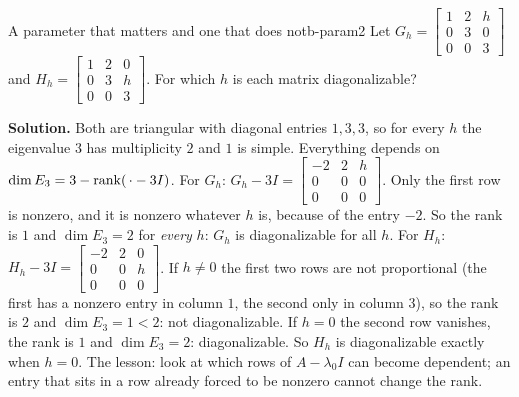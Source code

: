 \documentclass[11pt]{article}
\begin{document}
\begin{exmp}{A parameter that matters and one that does not}{b-param2}
Let $G_h=\begin{bmatrix}1&2&h\\0&3&0\\0&0&3\end{bmatrix}$ and $H_h=\begin{bmatrix}1&2&0\\0&3&h\\0&0&3\end{bmatrix}$. For which $h$ is each matrix diagonalizable?

\textbf{Solution.} Both are triangular with diagonal entries $1,3,3$, so for every $h$ the eigenvalue $3$ has multiplicity $2$ and $1$ is simple. Everything depends on $\dim E_3=3-\operatorname{rank}(\,\cdot-3I)$. For $G_h$: $G_h-3I=\begin{bmatrix}-2&2&h\\0&0&0\\0&0&0\end{bmatrix}$. Only the first row is nonzero, and it is nonzero whatever $h$ is, because of the entry $-2$. So the rank is $1$ and $\dim E_3=2$ for \emph{every} $h$: $G_h$ is diagonalizable for all $h$. For $H_h$: $H_h-3I=\begin{bmatrix}-2&2&0\\0&0&h\\0&0&0\end{bmatrix}$. If $h\neq0$ the first two rows are not proportional (the first has a nonzero entry in column $1$, the second only in column $3$), so the rank is $2$ and $\dim E_3=1<2$: not diagonalizable. If $h=0$ the second row vanishes, the rank is $1$ and $\dim E_3=2$: diagonalizable. So $H_h$ is diagonalizable exactly when $h=0$. The lesson: look at which rows of $A-\lambda_0I$ can become dependent; an entry that sits in a row already forced to be nonzero cannot change the rank.
\end{exmp}
\end{document}
